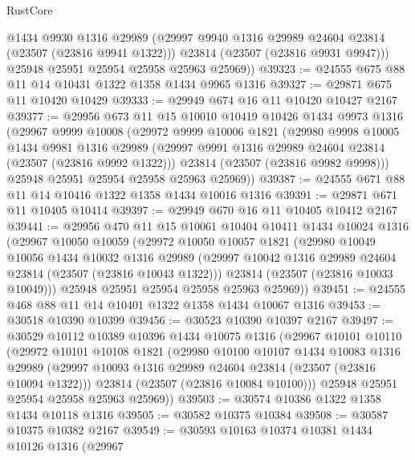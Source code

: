 \begin{lexlean}{RustCore}
\begin{coremodule}
          @1434
          @9930
          @1316
          @29989
          (@29997 @9940 @1316 @29989 @24604 @23814 (@23507 (@23816 @9941 @1322)))
          @23814
          (@23507 (@23816 @9931 @9947)))
        @25948
        @25951
        @25954
        @25958
        @25963
        @25969))
@39323 := @24555 @675 @88 @11 @14 @10431 @1322 @1358 @1434 @9965 @1316
@39327 := @29871 @675 @11 @10420 @10429
@39333 := @29949 @674 @16 @11 @10420 @10427 @2167
@39377 := @29956
    @673
    @11
    @15
    @10010
    @10419
    @10426
    @1434
    @9973
    @1316
    (@29967
      @9999
      @10008
      (@29972
        @9999
        @10006
        @1821
        (@29980
          @9998
          @10005
          @1434
          @9981
          @1316
          @29989
          (@29997 @9991 @1316 @29989 @24604 @23814 (@23507 (@23816 @9992 @1322)))
          @23814
          (@23507 (@23816 @9982 @9998)))
        @25948
        @25951
        @25954
        @25958
        @25963
        @25969))
@39387 := @24555 @671 @88 @11 @14 @10416 @1322 @1358 @1434 @10016 @1316
@39391 := @29871 @671 @11 @10405 @10414
@39397 := @29949 @670 @16 @11 @10405 @10412 @2167
@39441 := @29956
    @470
    @11
    @15
    @10061
    @10404
    @10411
    @1434
    @10024
    @1316
    (@29967
      @10050
      @10059
      (@29972
        @10050
        @10057
        @1821
        (@29980
          @10049
          @10056
          @1434
          @10032
          @1316
          @29989
          (@29997 @10042 @1316 @29989 @24604 @23814 (@23507 (@23816 @10043 @1322)))
          @23814
          (@23507 (@23816 @10033 @10049)))
        @25948
        @25951
        @25954
        @25958
        @25963
        @25969))
@39451 := @24555 @468 @88 @11 @14 @10401 @1322 @1358 @1434 @10067 @1316
@39453 := @30518 @10390 @10399
@39456 := @30523 @10390 @10397 @2167
@39497 := @30529
    @10112
    @10389
    @10396
    @1434
    @10075
    @1316
    (@29967
      @10101
      @10110
      (@29972
        @10101
        @10108
        @1821
        (@29980
          @10100
          @10107
          @1434
          @10083
          @1316
          @29989
          (@29997 @10093 @1316 @29989 @24604 @23814 (@23507 (@23816 @10094 @1322)))
          @23814
          (@23507 (@23816 @10084 @10100)))
        @25948
        @25951
        @25954
        @25958
        @25963
        @25969))
@39503 := @30574 @10386 @1322 @1358 @1434 @10118 @1316
@39505 := @30582 @10375 @10384
@39508 := @30587 @10375 @10382 @2167
@39549 := @30593
    @10163
    @10374
    @10381
    @1434
    @10126
    @1316
    (@29967

\end{coremodule}
\end{lexlean}
